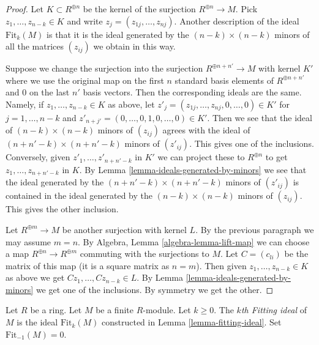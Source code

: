 \begin{proof}
Let $K \subset R^{\oplus n}$ be the kernel of the surjection
$R^{\oplus n} \to M$. Pick $z_1, \ldots, z_{n - k} \in K$
and write $z_j = (z_{1j}, \ldots, z_{nj})$.
Another description of the ideal $\text{Fit}_k(M)$
is that it is the ideal generated by the $(n - k) \times (n - k)$ minors of
all the matrices $(z_{ij})$ we obtain in this way.

\medskip\noindent
Suppose we change the surjection into the surjection
$R^{\oplus n + n'} \to M$ with kernel $K'$ where we use the original
map on the first $n$ standard basis elements of $R^{\oplus n + n'}$
and $0$ on the last $n'$ basis vectors. Then the corresponding ideals
are the same. Namely, if $z_1, \ldots, z_{n - k} \in K$ as above,
let $z'_j = (z_{1j}, \ldots, z_{nj}, 0, \ldots, 0) \in K'$ for
$j = 1, \ldots, n - k$ and
$z'_{n + j'} = (0, \ldots, 0, 1, 0, \ldots, 0) \in K'$. Then we see that
the ideal of $(n - k) \times (n - k)$ minors of $(z_{ij})$ agrees
with the ideal of $(n + n' - k) \times (n + n' - k)$ minors of
$(z'_{ij})$. This gives one of the inclusions.
Conversely, given  $z'_1, \ldots, z'_{n + n' - k}$
in $K'$ we can project these to $R^{\oplus n}$ to get
$z_1, \ldots, z_{n + n' - k}$ in $K$. By
Lemma \ref{lemma-ideals-generated-by-minors}
we see that the ideal generated by the
$(n + n' - k) \times (n + n' - k)$ minors of
$(z'_{ij})$ is contained in the ideal generated by the
$(n - k) \times (n - k)$ minors of $(z_{ij})$. This gives the
other inclusion.

\medskip\noindent
Let $R^{\oplus m} \to M$ be another surjection with kernel $L$.
By the previous paragraph we may assume $m = n$.
By Algebra, Lemma \ref{algebra-lemma-lift-map} we can choose a map
$R^{\oplus n} \to R^{\oplus m}$ commuting with the surjections to $M$.
Let $C = (c_{li})$ be the matrix of this map (it is a square
matrix as $n = m$). Then given
$z_1, \ldots, z_{n - k} \in K$ as above we get
$Cz_1, \ldots, Cz_{n - k} \in L$. By
Lemma \ref{lemma-ideals-generated-by-minors} we get one of the
inclusions. By symmetry we get the other.
\end{proof}

\begin{definition}
\label{definition-fitting-ideal}
Let $R$ be a ring. Let $M$ be a finite $R$-module. Let $k \geq 0$.
The {\it $k$th Fitting ideal} of $M$ is the ideal $\text{Fit}_k(M)$
constructed in Lemma \ref{lemma-fitting-ideal}. Set $\text{Fit}_{-1}(M) = 0$.
\end{definition}


